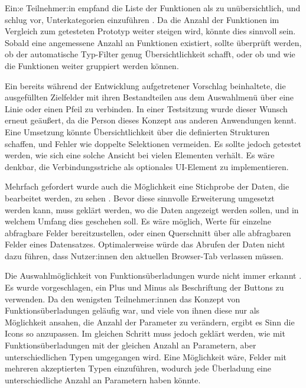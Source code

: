 Ein:e Teilnehmer:in empfand die Liste der Funktionen als zu unübersichtlich, und schlug vor, Unterkategorien einzuführen . Da die Anzahl der Funktionen im Vergleich zum getesteten Prototyp weiter steigen wird, könnte dies sinnvoll sein. Sobald eine angemessene Anzahl an Funktionen existiert, sollte überprüft werden, ob der automatische Typ-Filter genug Übersichtlichkeit schafft, oder ob und wie die Funktionen weiter gruppiert werden können.

Ein bereits während der Entwicklung aufgetretener Vorschlag beinhaltete, die ausgefüllten Zielfelder mit ihren Bestandteilen aus dem Auswahlmenü über eine Linie oder einen Pfeil zu verbinden. In einer Testsitzung wurde dieser Wunsch erneut geäußert, da die Person dieses Konzept aus anderen Anwendungen kennt. Eine Umsetzung könnte Übersichtlichkeit über die definierten Strukturen schaffen, und Fehler wie doppelte Selektionen vermeiden. Es sollte jedoch getestet werden, wie sich eine solche Ansicht bei vielen Elementen verhält. Es wäre denkbar, die Verbindungsstriche als optionales UI-Element zu implementieren.

Mehrfach gefordert wurde auch die Möglichkeit eine Stichprobe der Daten, die bearbeitet werden, zu sehen . Bevor diese sinnvolle Erweiterung umgesetzt werden kann, muss geklärt werden, wo die Daten angezeigt werden sollen, und in welchem Umfang dies geschehen soll. Es wäre möglich, Werte für einzelne abfragbare Felder bereitzustellen, oder einen Querschnitt über alle abfragbaren Felder eines Datensatzes. Optimalerweise würde das Abrufen der Daten nicht dazu führen, dass Nutzer:innen den aktuellen Browser-Tab verlassen müssen.

Die Auswahlmöglichkeit von Funktionsüberladungen wurde nicht immer erkannt . Es wurde vorgeschlagen, ein Plus und Minus als Beschriftung der Buttons zu verwenden. Da den wenigsten Teilnehmer:innen das Konzept von Funktionsüberladungen geläufig war, und viele von ihnen diese nur als Möglichkeit ansahen, die Anzahl der Parameter zu verändern, ergibt es Sinn die Icons so anzupassen. Im gleichen Schritt muss jedoch geklärt werden, wie mit Funktionsüberladungen mit der gleichen Anzahl an Parametern, aber unterschiedlichen Typen umgegangen wird. Eine Möglichkeit wäre, Felder mit mehreren akzeptierten Typen einzuführen, wodurch jede Überladung eine unterschiedliche Anzahl an Parametern haben könnte.

